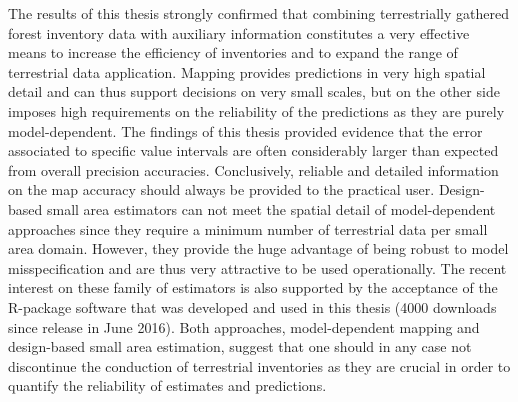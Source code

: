 The results of this thesis strongly confirmed that combining terrestrially gathered forest inventory data with auxiliary information constitutes a very effective means to increase the efficiency of inventories and to expand the range of terrestrial data application. Mapping provides predictions in very high spatial detail and can thus support decisions on very small scales, but on the other side imposes high requirements on the reliability of the predictions as they are purely model-dependent. The findings of this thesis provided evidence that the error associated to specific value intervals are often considerably larger than expected from overall precision accuracies. Conclusively, reliable and detailed information on the map accuracy should always be provided to the practical user. Design-based small area estimators can not meet the spatial detail of model-dependent approaches since they require a minimum number of terrestrial data per small area domain. However, they provide the huge advantage of being robust to model misspecification and are thus very attractive to be used operationally. The recent interest on these family of estimators is also supported by the acceptance of the R-package software that was developed and used in this thesis (4000 downloads since release in June 2016). Both approaches, model-dependent mapping and design-based small area estimation, suggest that one should in any case not discontinue the conduction of terrestrial inventories as they are crucial in order to quantify the reliability of estimates and predictions.\par

